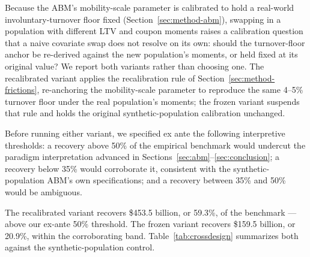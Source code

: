 \documentclass[12pt]{article}
\begin{document}
Because the ABM's mobility-scale parameter is calibrated to hold a real-world involuntary-turnover floor fixed (Section~\ref{sec:method-abm}), swapping in a population with different LTV and coupon moments raises a calibration question that a naive covariate swap does not resolve on its own: should the turnover-floor anchor be re-derived against the new population's moments, or held fixed at its original value? We report both variants rather than choosing one. The recalibrated variant applies the recalibration rule of Section~\ref{sec:method-frictions}, re-anchoring the mobility-scale parameter to reproduce the same 4--5\% turnover floor under the real population's moments; the frozen variant suspends that rule and holds the original synthetic-population calibration unchanged.

Before running either variant, we specified ex ante the following interpretive thresholds: a recovery above 50\% of the empirical benchmark would undercut the paradigm interpretation advanced in Sections~\ref{sec:abm}--\ref{sec:conclusion}; a recovery below 35\% would corroborate it, consistent with the synthetic-population ABM's own specifications; and a recovery between 35\% and 50\% would be ambiguous.

The recalibrated variant recovers \$453.5 billion, or 59.3\%, of the benchmark --- above our ex-ante 50\% threshold. The frozen variant recovers \$159.5 billion, or 20.9\%, within the corroborating band. Table~\ref{tab:crossdesign} summarizes both against the synthetic-population control.
\end{document}
